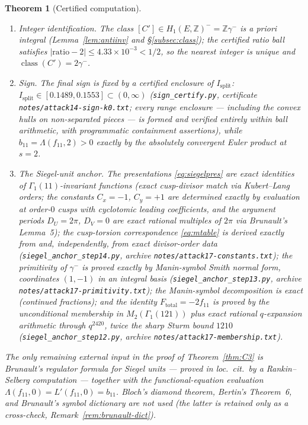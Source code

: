 \documentclass[11pt]{amsart}
\newtheorem{theorem}{Theorem}[section]
\theoremstyle{definition}
\theoremstyle{remark}
\newcommand{\Z}{\mathbb{Z}}
\DeclareMathOperator{\class}{class}
\begin{document}
\begin{theorem}[Certified computation]
\begin{enumerate}
  period \textup{(}\texttt{n1\_interval.py}, certificate
  \texttt{notes/attack10-interval.txt}\textup{)}.
  \item \emph{Integer identification.} The class $[C']\in H_1(E,\Z)^-=\Z\gamma^-$
  is a priori integral \textup{(}Lemma~\ref{lem:antiinv} and
  \S\ref{subsec:class}\textup{)}; the certified ratio ball satisfies
  $|\mathrm{ratio}-2|\le4.33\times10^{-3}<1/2$, so the nearest integer is
  unique and $\class(C')=2\gamma^-$.
  \item \emph{Sign.} The final sign is fixed by a certified enclosure of
  $I_{\mathrm{split}}$: $I_{\mathrm{split}}\in[0.1489,0.1553]\subset(0,\infty)$
  \textup{(}\texttt{sign\_certify.py}, certificate
  \texttt{notes/attack14-sign-k0.txt}; every range enclosure --- including
  the convex hulls on non-separated pieces --- is formed and verified
  entirely within ball arithmetic, with programmatic containment
  assertions\textup{)}, while
  $b_{11}=\Lambda(f_{11},2)>0$ exactly by the absolutely convergent Euler
  product at $s=2$.
  \item \emph{The Siegel-unit anchor.} The presentations
  \eqref{eq:siegelpres} are exact identities of $\Gamma_1(11)$-invariant
  functions \textup{(}exact cusp-divisor match via Kubert--Lang orders;
  the constants $C_x=-1$, $C_y=+1$ are determined exactly by evaluation
  at order-$0$ cusps with cyclotomic leading coefficients, and the
  argument periods $D_U=2\pi$, $D_V=0$ are exact rational multiples of
  $2\pi$ via Brunault's Lemma~5\textup{)}; the cusp-torsion
  correspondence \eqref{eq:mtable} is derived exactly from
  \cite[(3.152)--(3.153)]{Brunault} and, independently, from exact
  divisor-order data \textup{(}\texttt{siegel\_anchor\_step14.py},
  archive \texttt{notes/attack17-constants.txt}\textup{)}; the
  primitivity of $\gamma^-$ is proved exactly by Manin-symbol Smith
  normal form, coordinates $(1,-1)$ in an integral basis
  \textup{(}\texttt{siegel\_anchor\_step13.py}, archive
  \texttt{notes/attack17-primitivity.txt}\textup{)}; the Manin-symbol
  decomposition is exact \textup{(}continued fractions\textup{)}; and
  the identity $F_{\mathrm{total}}=-2f_{11}$ is proved by the
  unconditional membership in $M_2(\Gamma_1(121))$ plus exact rational
  $q$-expansion arithmetic through $q^{2420}$, twice the sharp Sturm
  bound $1210$ \textup{(}\texttt{siegel\_anchor\_step12.py}, archive
  \texttt{notes/attack17-membership.txt}\textup{)}.
\end{enumerate}
The only remaining external input in the proof of
Theorem~\ref{thm:C3} is Brunault's regulator formula for Siegel units
\cite[Thm.~1]{BrunaultSiegel} --- proved in loc.\ cit.\ by a Rankin--Selberg
computation --- together with the functional-equation evaluation
$\Lambda(f_{11},0)=L'(f_{11},0)=b_{11}$.  Bloch's diamond theorem,
Bertin's Theorem~6, and Brunault's symbol dictionary are \emph{not} used
\textup{(}the latter is retained only as a cross-check,
Remark~\ref{rem:brunault-dict}\textup{)}.
\end{theorem}
\end{document}
